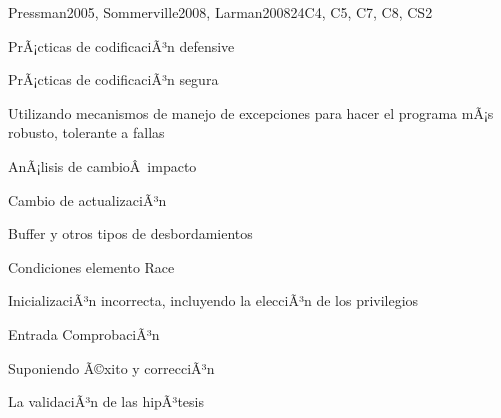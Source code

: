 \begin{syllabus}
\begin{unit}{\SESoftwareConstruction}{}{Pressman2005, Sommerville2008, Larman2008}{24}{C4, C5, C7, C8, CS2}
	\begin{topics}
		\item \SESoftwareConstructionTopicCoding
		\begin{subtopic}
			\item PrÃ¡cticas de codificaciÃ³n defensive
			\item PrÃ¡cticas de codificaciÃ³n segura
			\item Utilizando mecanismos de manejo de excepciones para hacer el programa mÃ¡s robusto, tolerante a fallas
		\end{subtopic}
		\item \SESoftwareConstructionTopicCodingStandards
		\item \SESoftwareConstructionTopicIntegration
		\item \SESoftwareConstructionTopicDevelopment
		\begin{subtopic} 
			\item AnÃ¡lisis de cambioÂ impacto 
			\item Cambio de actualizaciÃ³n 
		\end{subtopic}
		\item \SESoftwareConstructionTopicPotential
		\begin{subtopic} 
			\item Buffer y otros tipos de desbordamientos 
			\item Condiciones elemento Race 
			\item InicializaciÃ³n incorrecta, incluyendo la elecciÃ³n de los privilegios 
			\item Entrada ComprobaciÃ³n 
			\item Suponiendo Ã©xito y correcciÃ³n 
			\item La validaciÃ³n de las hipÃ³tesis 
		\end{subtopic}
	\end{topics}
	\begin{learningoutcomes}
		\item \SESoftwareConstructionLODescribeTechniques[\Assessment]
		\item \SESoftwareConstructionLOBuild[\Assessment]
		\item \SESoftwareConstructionLODescribeSecure[\Assessment]
		\item \SESoftwareConstructionLOSelectAndDefined[\Assessment]
		\item \SESoftwareConstructionLOCompareAndStrategies[\Assessment]
		\item \SESoftwareConstructionLODescribeTheAnalyzing[\Assessment]
		\item \SESoftwareConstructionLODescribeTheAnalyzingChanges[\Assessment]
		\item \SESoftwareConstructionLORewrite[\Assessment]
		\item \SESoftwareConstructionLOWriteAThatNon[\Assessment]
	\end{learningoutcomes}
\end{unit}




\end{syllabus}
